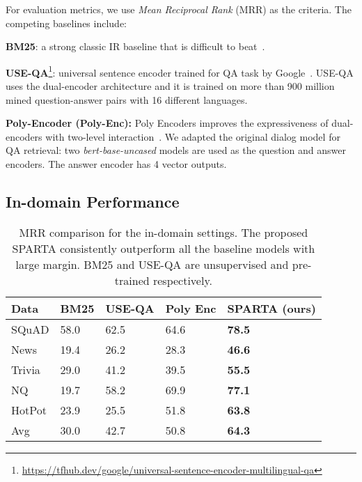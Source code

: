 \documentclass[11pt,a4paper]{article}
\begin{document}
For evaluation metrics, we use \textit{Mean Reciprocal Rank} (MRR) as the criteria. The competing baselines include:

\textbf{BM25}: a strong classic IR baseline that is difficult to beat~\cite{robertson2009probabilistic}.

\textbf{USE-QA}\footnote{\url{https://tfhub.dev/google/universal-sentence-encoder-multilingual-qa}}: universal sentence encoder trained for QA task by Google~\cite{yang2019multilingual}. USE-QA uses the dual-encoder architecture and it is trained on more than 900 million mined question-answer pairs with 16 different languages. 

\textbf{Poly-Encoder (Poly-Enc):} Poly Encoders improves the expressiveness of dual-encoders with two-level interaction~\cite{humeau2019poly}. We adapted the original dialog model for QA retrieval: two \textit{bert-base-uncased} models are used as the question and answer encoders. The answer encoder has 4 vector outputs.
 \subsection{In-domain Performance}
\begin{table}[]
\centering
\begin{tabular}{p{}|p{}p{}p{}p{}} \hline
\textbf{Data} & \textbf{BM25} & \textbf{USE-QA} & \textbf{Poly Enc} & \textbf{SPARTA (ours)}\\ \hline
SQuAD  & 58.0 & 62.5   & 64.6     & \textbf{78.5}   \\
News   & 19.4 & 26.2 & 28.3     & \textbf{46.6}  \\
Trivia & 29.0   & 41.2   & 39.5     & \textbf{55.5}   \\
NQ     & 19.7 & 58.2   & 69.9     & \textbf{77.1}   \\
HotPot & 23.9 & 25.5   & 51.8     & \textbf{63.8}  \\ \hline
Avg    & 30.0 &  42.7  &  50.8  & \textbf{64.3} \\ \hline
\end{tabular}
\caption{MRR comparison for the in-domain settings. The proposed SPARTA consistently outperform all the baseline models with large margin. BM25 and USE-QA are unsupervised and pre-trained respectively.}
\label{tbl:in-domain}
\end{table}
\end{document}
